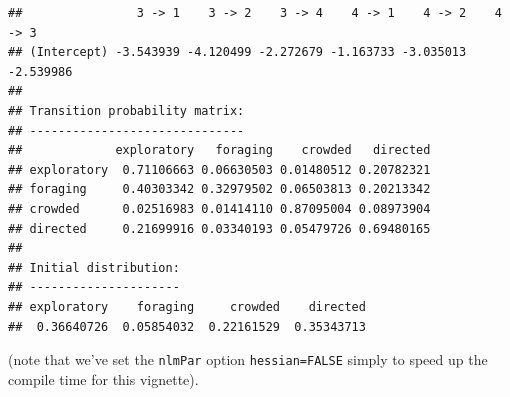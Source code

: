 \documentclass[12pt]{article}\usepackage[]{graphicx}\usepackage[]{xcolor}
\makeatletter
\newenvironment{kframe}{%
 \def\at@end@of@kframe{}%
 \ifinner\ifhmode%
  \def\at@end@of@kframe{\end{minipage}}%
  \begin{minipage}{\columnwidth}%
 \fi\fi%
 \def\FrameCommand##1{\hskip\@totalleftmargin \hskip-\fboxsep
 \colorbox{shadecolor}{##1}\hskip-\fboxsep
     \hskip-\linewidth \hskip-\@totalleftmargin \hskip\columnwidth}%
 \MakeFramed {\advance\hsize-\width
   \@totalleftmargin\z@ \linewidth\hsize
   \@setminipage}}%
 {\par\unskip\endMakeFramed%
 \at@end@of@kframe}
\newenvironment{knitrout}{}{} %
\makeatother
\begin{document}
\begin{knitrout}
\begin{kframe}
\begin{verbatim}
##                3 -> 1    3 -> 2    3 -> 4    4 -> 1    4 -> 2    4 -> 3
## (Intercept) -3.543939 -4.120499 -2.272679 -1.163733 -3.035013 -2.539986
## 
## Transition probability matrix:
## ------------------------------
##             exploratory   foraging    crowded   directed
## exploratory  0.71106663 0.06630503 0.01480512 0.20782321
## foraging     0.40303342 0.32979502 0.06503813 0.20213342
## crowded      0.02516983 0.01414110 0.87095004 0.08973904
## directed     0.21699916 0.03340193 0.05479726 0.69480165
## 
## Initial distribution:
## ---------------------
## exploratory    foraging     crowded    directed 
##  0.36640726  0.05854032  0.22161529  0.35343713
\end{verbatim}
\end{kframe}
\end{knitrout}
\noindent (note that we've set the \verb|nlmPar| option \verb|hessian=FALSE| simply to speed up the compile time for this vignette). 
\end{document}

